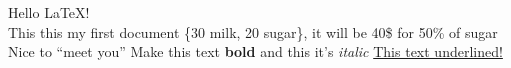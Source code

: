 \documentclass{article}
\begin{document}
	Hello LaTeX!\\ %
	This this my first \quad document %
	\{30 milk, 20 sugar\}, it will be 40\$ for 50\% of sugar %
	Nice to ``meet you''
	Make this text \textbf{bold} 
	and this it's \textit{italic}
	\underline{This text underlined!}
\end{document}
